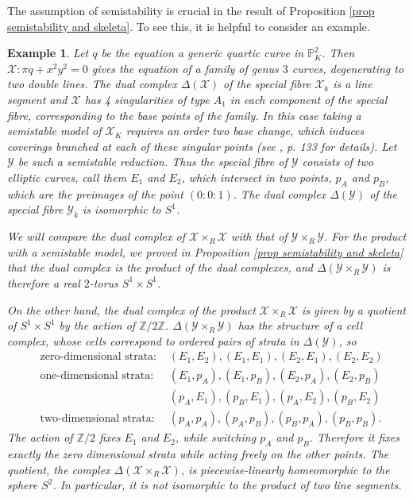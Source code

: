 \documentclass{amsart}%
\numberwithin{equation}{subsection}
\theoremstyle{plain2}
\theoremstyle{definition2}
\newtheorem{example}[equation]{Example}
\theoremstyle{stepstyle}
\theoremstyle{point}
\theoremstyle{subpoint}
\newcommand{\Z}{\ensuremath{\mathbb{Z}}}
\newcommand{\cX}{\ensuremath{\mathscr{X}}}
\newcommand{\cY}{\ensuremath{\mathscr{Y}}}
\renewcommand{\cY}{\ensuremath{\mathscr{Y}}}
\begin{document}
The assumption of semistability is crucial in the result of Proposition \ref{prop semistability and skeleta}. To see this, it is helpful to consider an example.
\begin{example}\label{quartic} Let $q$ be the equation a generic quartic curve in $\mathbb{P}^2_K$. Then $\cX:\pi q+x^2y^2=0$ gives the equation of a family of genus $3$ curves, degenerating to two double lines. The dual complex $\Delta(\cX)$ of the special fibre $\cX_k$ is a line segment and $\cX$ has 4 singularities of type $A_1$ in each component of the special fibre, corresponding to the base points of the family. In this case taking a semistable model of $\cX_K$ requires an order two base change, which induces coverings branched at each of these singular points (see \cite{HarrisMorrison}, p. 133 for details). Let $\cY$ be such a semistable reduction. Thus the special fibre of $\cY$ consists of two elliptic curves, call them $E_1$ and $E_2$, which intersect in two points, $p_A$ and $p_B$, which are the preimages of the point $(0:0:1)$. The dual complex $\Delta(\cY)$ of the special fibre $\cY_k$ is isomorphic to $S^1$.

We will compare the dual complex of $\cX \times_{R} \cX$ with that of $\cY\times_{R} \cY$. For the product with a  semistable model, we proved in Proposition \ref{prop semistability and skeleta} that the dual complex is the product of the dual complexes, and $\Delta(\cY \times_R \cY)$ is therefore a real $2$-torus  $S^1 \times S^1$.

On the other hand, the dual complex of the product $\cX \times_{R} \cX$ is given by a quotient of $S^1 \times S^1$ by the action of $\mathbb{Z}/2\Z$.  $\Delta(\cY \times_R \cY)$ has the structure of a cell complex, whose cells correspond to ordered pairs of strata in  $\Delta(\cY)$, so
\begin{align*}
&\text{zero-dimensional strata: }&(E_1, E_2), (E_1, E_1), (E_2, E_1), (E_2, E_2)\\
&\text{one-dimensional strata: }&(E_1, p_A), (E_1, p_B), (E_2, p_A), (E_2, p_B)\\
& &(p_A, E_1), (p_B, E_1), (p_A, E_2), (p_B, E_2)\\
&\text{two-dimensional strata: }& (p_A, p_A), (p_A, p_B), (p_B, p_A), (p_B, p_B).\end{align*}
The action of $\mathbb{Z}/2$ fixes $E_1$ and $E_2$, while switching $p_A$ and $p_B$. Therefore it fixes exactly the zero dimensional strata while acting freely on the other points. The quotient, the complex $\Delta(\cX\times_{R}\cX)$, is piecewise-linearly homeomorphic to the sphere $S^2$. In particular, it is not isomorphic to the product of two line segments.
\end{example}
\end{document}

